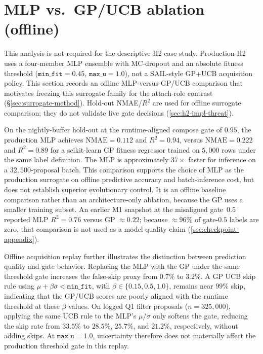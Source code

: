 \section{MLP vs.\ GP/UCB ablation (offline)}
\label{sec:surrogate-ablation-appendix}

This analysis is not required for the descriptive H2 case study. Production H2 uses a four-member MLP ensemble with MC-dropout and an absolute fitness threshold ($\texttt{min\_fit}{=}0.45$, $\texttt{max\_u}{=}1.0$), not a SAIL-style GP+UCB acquisition policy. This section records an offline MLP-versus-GP/UCB comparison that motivates freezing this surrogate family for the attach-role contrast (\S\ref{sec:surrogate-method}). Hold-out NMAE/$R^{2}$ are used for offline surrogate comparison; they do not validate live gate decisions (\ref{sec:h2-impl-threat}).

On the nightly-buffer hold-out at the runtime-aligned compose gate of $0.95$, the production MLP achieves $\mathrm{NMAE}{=}0.112$ and $R^{2}{=}0.94$, versus $\mathrm{NMAE}{=}0.222$ and $R^{2}{=}0.89$ for a scikit-learn GP fitness regressor trained on $5{,}000$ rows under the same label definition. The MLP is approximately $37\times$ faster for inference on a $32{,}500$-proposal batch. This comparison supports the choice of MLP as the production surrogate on offline predictive accuracy and batch-inference cost, but does not establish superior evolutionary control. It is an offline baseline comparison rather than an architecture-only ablation, because the GP uses a smaller training subset. An earlier M1 snapshot at the misaligned gate~$0.5$ reported MLP $R^{2}{=}0.76$ versus GP ${\approx}0.22$; because ${\approx}96\%$ of gate-$0.5$ labels are zero, that comparison is not used as a model-quality claim (\ref{sec:checkpoint-appendix}).

Offline acquisition replay further illustrates the distinction between prediction quality and gate behavior. Replacing the MLP with the GP under the same threshold gate increases the false-skip proxy from $0.7\%$ to $3.2\%$. A GP UCB skip rule using $\mu{+}\beta\sigma < \texttt{min\_fit}$, with $\beta\in\{0.15,0.5,1.0\}$, remains near $99\%$ skip, indicating that the GP/UCB scores are poorly aligned with the runtime threshold at these $\beta$ values. On logged Q1 filter proposals ($n{=}325{,}000$), applying the same UCB rule to the MLP's $\mu/\sigma$ only softens the gate, reducing the skip rate from $33.5\%$ to $28.5\%$, $25.7\%$, and $21.2\%$, respectively, without adding skips. At $\texttt{max\_u}{=}1.0$, uncertainty therefore does not materially affect the production threshold gate in this replay.

